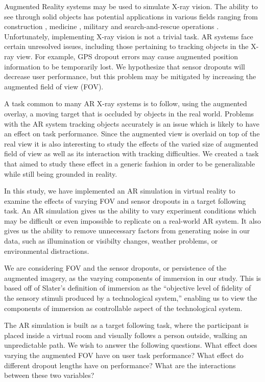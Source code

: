 \documentclass{acmsiggraph}                     %
\begin{document}

Augmented Reality systems may be used to simulate X-ray vision.  The ability to see through solid objects has potential applications in various fields ranging from construction \cite{Webster96augmentedreality}, medicine \cite{azuma95survey}, military \cite{Livingston02anaugmented} and search-and-rescue operations \cite{1528424}.  Unfortunately, implementing X-ray vision is not a trivial task.  AR systems face certain unresolved issues, including those pertaining to tracking objects in the X-ray view.  For example, GPS dropout errors \cite{4079263} may cause augmented position information to be temporarily lost.  We hypothesize that sensor dropouts will decrease user performance, but this problem may be mitigated by increasing the augmented field of view (FOV).

A task common to many AR X-ray systems is to follow, using the augmented overlay, a moving target that is occluded by objects in the real world.  Problems with the AR system tracking objects accurately is an issue which is likely to have an effect on task performance.  Since the augmented view is overlaid on top of the real view it is also interesting to study the effects of the varied size of augmented field of view as well as its interaction with tracking difficulties.  We created a task that aimed to study these effect in a generic fashion in order to be generalizable while still being grounded in reality.

In this study, we have implemented an AR simulation in virtual reality to examine the effects of varying FOV and sensor dropouts in a target following task.  An AR simulation gives us the ability to vary experiment conditions which may be difficult or even impossible to replicate on a real-world AR system.  It also gives us the ability to remove unnecessary factors from generating noise in our data, such as illumination or visibilty changes, weather problems, or environmental distractions. 

We are considering FOV and the sensor dropouts, or persistence of the augmented imagery, as the varying components of immersion in our study.  This is based off of Slater's definition \cite{slater} of immersion as the ``objective level of fidelity of the sensory stimuli produced by a technological system,''  enabling us to view the components of immersion as controllable aspect of the technological system.

The AR simulation is built as a target following task, where the participant is placed inside a virtual room and visually follows a person outside, walking an unpredictable path.  We wish to answer the following questions.  What effect does varying the augmented FOV have on user task performance?  What effect do different dropout lengths have on performance?  What are the interactions between these two variables?
\end{document}
